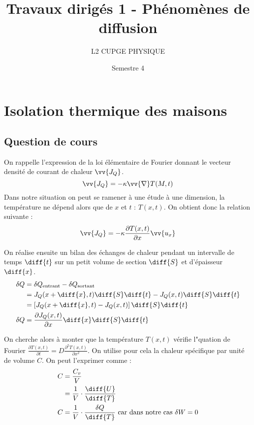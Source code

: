 \documentclass[a4paper,12pt]{article}
\title{Travaux dirigés 1 - Phénomènes de diffusion}
\author{L2 CUPGE PHYSIQUE}
\date{Semestre 4}
\begin{document}
\maketitle

\section{Isolation thermique des maisons}

\subsection{Question de cours}

On rappelle l'expression de la loi élémentaire de Fourier donnant le vecteur densité de courant de chaleur $\vv{J_Q}$.
\begin{equation}
	\vv{J_Q} = - \kappa \vv{\nabla} T(M,t)
\end{equation}
Dans notre situation on peut se ramener à une étude à une dimension, la température ne dépend alors que de $x$ et $t$ : $T(x,t)$. On obtient donc la relation suivante :
\begin{equation}
	\vv{J_Q} = - \kappa \frac{\partial T(x,t)}{\partial x} \vv{u_x}
\end{equation}

On réalise ensuite un bilan des échanges de chaleur pendant un intervalle de temps $\diff{t}$ sur un petit volume de section $\diff{S}$ et d'épaisseur $\diff{x}$.
\begin{equation}
	\begin{split}
		\delta Q	&= \delta Q_\text{entrant} - \delta Q_\text{sortant}\\
					&= J_Q ( x+\diff{x},t ) \diff{S}\diff{t} - J_Q (x,t) \diff{S}\diff{t}\\
					&= \left[ J_Q (x+\diff{x},t) - J_Q (x,t) \right] \diff{S}\diff{t}\\
		\delta Q 	&= \frac{\partial J_Q (x,t)}{\partial x} \diff{x} \diff{S} \diff{t}
	\end{split}
\end{equation}

On cherche alors à monter que la température $T(x,t)$ vérifie l"quation de Fourier $\frac{\partial T(x,t)}{\partial t} = D \frac{\partial^2 T(x,t)}{\partial x^2}$. On utilise pour cela la chaleur spécifique par unité de volume $C$. On peut l'exprimer comme :
\begin{equation}
	\begin{split}
		C &= \frac{C_v}{V}\\
		  &= \frac{1}{V} \cdot \frac{\diff{U}}{\diff{T}}\\
		C &= \frac{1}{V} \cdot \frac{\delta Q}{\diff{T}} \text{ car dans notre cas } \delta W = 0
	\end{split}
\end{equation}
\end{document}
